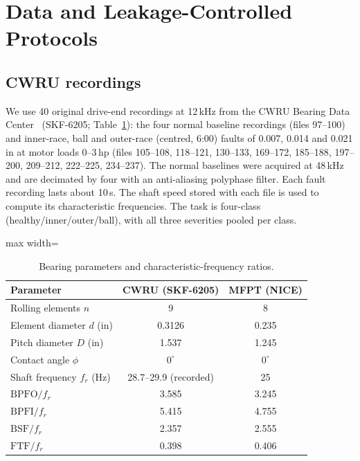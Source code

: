\documentclass[conference]{IEEEtran}
\begin{document}
\section{Data and Leakage-Controlled Protocols}
\label{sec:data}
\subsection{CWRU recordings}
We use 40 original drive-end recordings at 12\,kHz from the CWRU Bearing Data
Center~\cite{cwru} (SKF-6205; Table~\ref{tab:params}): the four normal baseline
recordings (files 97--100) and inner-race, ball and outer-race (centred, 6:00)
faults of 0.007, 0.014 and 0.021\,in at motor loads 0--3\,hp (files 105--108,
118--121, 130--133, 169--172, 185--188, 197--200, 209--212, 222--225,
234--237). The normal baselines were acquired at 48\,kHz~\cite{smith2015} and
are decimated by four with an anti-aliasing polyphase filter. Each fault
recording lasts about 10\,s. The shaft speed stored with each file is used to
compute its characteristic frequencies. The task is four-class
(healthy/inner/outer/ball), with all three severities pooled per class.

\begin{table}[t]
\caption{Bearing parameters and characteristic-frequency ratios.}
\label{tab:params}
\centering
\footnotesize
\begin{adjustbox}{max width=\columnwidth}
\begin{tabular}{lcc}
\toprule
Parameter & CWRU (SKF-6205) & MFPT (NICE) \\
\midrule
Rolling elements $n$ & 9 & 8 \\
Element diameter $d$ (in) & 0.3126 & 0.235 \\
Pitch diameter $D$ (in) & 1.537 & 1.245 \\
Contact angle $\phi$ & $0^{\circ}$ & $0^{\circ}$ \\
Shaft frequency $f_r$ (Hz) & 28.7--29.9 (recorded) & 25 \\
$\mathrm{BPFO}/f_r$ & 3.585 & 3.245 \\
$\mathrm{BPFI}/f_r$ & 5.415 & 4.755 \\
$\mathrm{BSF}/f_r$ & 2.357 & 2.555 \\
$\mathrm{FTF}/f_r$ & 0.398 & 0.406 \\
\bottomrule
\end{tabular}
\end{adjustbox}
\end{table}
\end{document}
